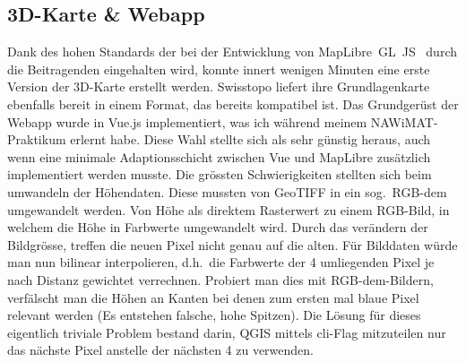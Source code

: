 \subsection{3D-Karte \& Webapp}

Dank des hohen Standards der bei der Entwicklung von MapLibre~GL~JS~\cite{maplibregljs} durch die Beitragenden eingehalten wird, konnte innert wenigen Minuten eine erste Version der 3D-Karte erstellt werden. Swisstopo liefert ihre Grundlagenkarte ebenfalls bereit in einem Format, das bereits kompatibel ist. Das Grundgerüst der Webapp wurde in Vue.js implementiert, was ich während meinem NAWiMAT-Praktikum erlernt habe. Diese Wahl stellte sich als sehr günstig heraus, auch wenn eine minimale Adaptionsschicht zwischen Vue und MapLibre zusätzlich implementiert werden musste.
Die grössten Schwierigkeiten stellten sich beim umwandeln der Höhendaten. Diese mussten von GeoTIFF in ein sog.\ RGB-\acrshort{dem} umgewandelt werden. Von Höhe als direktem Rasterwert zu einem RGB-Bild, in welchem die Höhe in Farbwerte umgewandelt wird. Durch das verändern der Bildgrösse, treffen die neuen Pixel nicht genau auf die alten. Für Bilddaten würde man nun bilinear interpolieren, d.h.\ die Farbwerte der 4 umliegenden Pixel je nach Distanz gewichtet verrechnen. Probiert man dies mit RGB-\acrshort{dem}-Bildern, verfälscht man die Höhen an Kanten bei denen zum ersten mal blaue Pixel relevant werden (Es entstehen falsche, hohe Spitzen). Die Lösung für dieses eigentlich triviale Problem bestand darin, QGIS mittels \acrshort{cli}-Flag mitzuteilen nur das nächste Pixel anstelle der nächsten 4 zu verwenden.

